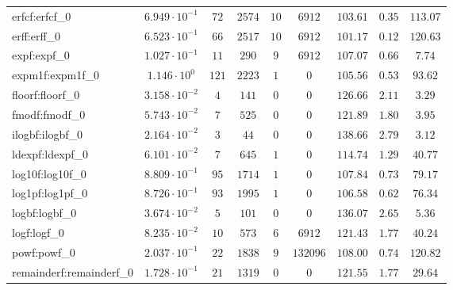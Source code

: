 \begin{tabular}{|l|c|c|c|c|c|c|c|c|}
erfcf:erfcf\_0               & $ 6.949 \cdot 10^{-1} $ & $ 72     $ & $ 2574  $ & $ 10  $ & $ 6912   $ & $ 103.61      $ & $ 0.35    $ & $ 113.07  $ \\
erff:erff\_0                 & $ 6.523 \cdot 10^{-1} $ & $ 66     $ & $ 2517  $ & $ 10  $ & $ 6912   $ & $ 101.17      $ & $ 0.12    $ & $ 120.63  $ \\
expf:expf\_0                 & $ 1.027 \cdot 10^{-1} $ & $ 11     $ & $ 290   $ & $ 9   $ & $ 6912   $ & $ 107.07      $ & $ 0.66    $ & $ 7.74    $ \\
expm1f:expm1f\_0             & $ 1.146 \cdot 10^{0}  $ & $ 121    $ & $ 2223  $ & $ 1   $ & $ 0      $ & $ 105.56      $ & $ 0.53    $ & $ 93.62   $ \\
floorf:floorf\_0             & $ 3.158 \cdot 10^{-2} $ & $ 4      $ & $ 141   $ & $ 0   $ & $ 0      $ & $ 126.66      $ & $ 2.11    $ & $ 3.29    $ \\
fmodf:fmodf\_0               & $ 5.743 \cdot 10^{-2} $ & $ 7      $ & $ 525   $ & $ 0   $ & $ 0      $ & $ 121.89      $ & $ 1.80    $ & $ 3.95    $ \\
ilogbf:ilogbf\_0             & $ 2.164 \cdot 10^{-2} $ & $ 3      $ & $ 44    $ & $ 0   $ & $ 0      $ & $ 138.66      $ & $ 2.79    $ & $ 3.12    $ \\
ldexpf:ldexpf\_0             & $ 6.101 \cdot 10^{-2} $ & $ 7      $ & $ 645   $ & $ 1   $ & $ 0      $ & $ 114.74      $ & $ 1.29    $ & $ 40.77   $ \\
log10f:log10f\_0             & $ 8.809 \cdot 10^{-1} $ & $ 95     $ & $ 1714  $ & $ 1   $ & $ 0      $ & $ 107.84      $ & $ 0.73    $ & $ 79.17   $ \\
log1pf:log1pf\_0             & $ 8.726 \cdot 10^{-1} $ & $ 93     $ & $ 1995  $ & $ 1   $ & $ 0      $ & $ 106.58      $ & $ 0.62    $ & $ 76.34   $ \\
logbf:logbf\_0               & $ 3.674 \cdot 10^{-2} $ & $ 5      $ & $ 101   $ & $ 0   $ & $ 0      $ & $ 136.07      $ & $ 2.65    $ & $ 5.36    $ \\
logf:logf\_0                 & $ 8.235 \cdot 10^{-2} $ & $ 10     $ & $ 573   $ & $ 6   $ & $ 6912   $ & $ 121.43      $ & $ 1.77    $ & $ 40.24   $ \\
powf:powf\_0                 & $ 2.037 \cdot 10^{-1} $ & $ 22     $ & $ 1838  $ & $ 9   $ & $ 132096 $ & $ 108.00      $ & $ 0.74    $ & $ 120.82  $ \\
remainderf:remainderf\_0     & $ 1.728 \cdot 10^{-1} $ & $ 21     $ & $ 1319  $ & $ 0   $ & $ 0      $ & $ 121.55      $ & $ 1.77    $ & $ 29.64   $ \\

\end{tabular}
